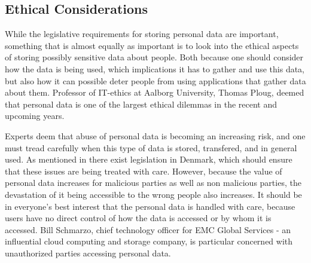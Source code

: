 
\subsection{Ethical Considerations}
\label{sub:ethical_considerations}

While the legislative requirements for storing personal data are important, something that is almost equally as important is to look into the ethical aspects of storing possibly sensitive data about people. Both because one should consider how the data is being used, which implications it has to gather and use this data, but also how it can possible deter people from using applications that gather data about them. Professor of IT-ethics at Aalborg University, Thomas Ploug, deemed that personal data is one of the largest ethical dilemmas in the recent and upcoming years.


Experts deem that abuse of personal data is becoming an increasing risk, and one must tread carefully when this type of data is stored, transfered, and in general used. As mentioned in  there exist legislation in Denmark, which should ensure that these issues are being treated with care. However, because the value of personal data increases for malicious parties as well as non malicious parties, the devastation of it being accessible to the wrong people also increases. It should be in everyone's best interest that the personal data is handled with care, because users have no direct control of how the data is accessed or by whom it is accessed. Bill Schmarzo, chief technology officer for EMC Global Services - an influential cloud computing and storage company, is particular concerned with unauthorized parties accessing personal data.


